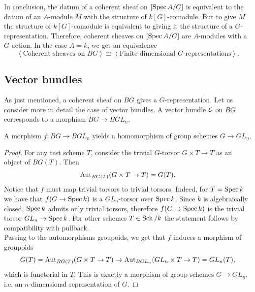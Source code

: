 In conclusion, the datum of a coherent sheaf on $[\operatorname{Spec} A / G]$ is equivalent to the datum of an $A$-module $M$ with the structure of $k[G]$-comodule. But to give $M$ the structure of $k[G]$-comodule is equivalent to giving it the structure of a $G$-representation. Therefore, coherent sheaves on $[\operatorname{Spec} A / G]$ are $A$-modules with a $G$-action. In the case $A = k$, we get an equivalence
\[
\left< \text{Coherent sheaves on } BG \right> \cong \left< \text{Finite dimensional } G\text{-representations} \right>.
\]

\subsection{Vector bundles}

As just mentioned, a coherent sheaf on $BG$ gives a $G$-representation. Let us consider more in detail the case of vector bundles.
A vector bundle $\mathcal{E}$ on $BG$ corresponds to a morphism $BG \to BGL_n$.

\begin{rmk}
A morphism $f \colon BG \to BGL_n$ yields a homomorphism of group schemes $G \to GL_n$.
\end{rmk}
\begin{proof}
    For any test scheme $T$, consider the trivial $G$-torsor $G \times T \to T$ as an object of $BG(T)$. Then
    \[
    \operatorname{Aut}_{BG(T)}(G \times T \to T) = G(T).
    \]
    Notice that $f$ must map trivial torsors to trivial torsors.
	Indeed, for $T = \operatorname{Spec} k$ we have that $f(G \to \operatorname{Spec} k)$ is a $GL_n$-torsor over $\operatorname{Spec} k$. Since $k$ is algebraically closed, $\operatorname{Spec} k$ admits only trivial torsors, therefore $f(G \to \operatorname{Spec} k)$ is the trivial torsor $GL_n \to \operatorname{Spec} k$. For other schemes $T \in \operatorname{Sch}/k$ the statement follows by compatibility with pullback.\\
    Passing to the automorphisms groupoids, we get that $f$ induces a morphism of groupoids
    \[
    G(T) = \operatorname{Aut}_{BG(T)}(G \times T \to T) \to \operatorname{Aut}_{BGL_n}(GL_n \times T \to T ) = GL_n(T),
    \]
    which is functorial in $T$. This is exactly a morphism of group schemes $G \to GL_n$, i.e. an $n$-dimensional representation of $G$.
\end{proof}

